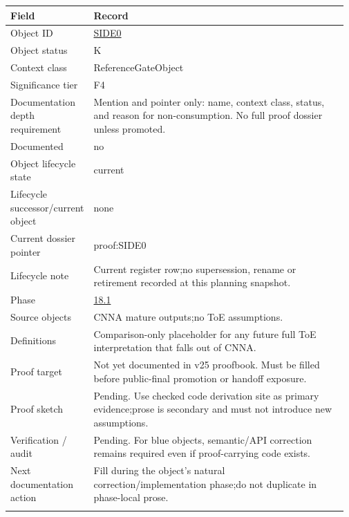 \begin{longtable}{L{0.16\linewidth} L{0.81\linewidth}}
\hline
\textbf{Field} & \textbf{Record}\\
\hline
Object ID & \hyperlink{object-row-SIDE0}{SIDE0}\\
\hline\addlinespace[0.20em]
Object status & K\\
\hline\addlinespace[0.20em]
Context class & ReferenceGateObject\\
\hline\addlinespace[0.20em]
Significance tier & F4\\
\hline\addlinespace[0.20em]
Documentation depth requirement & Mention and pointer only: name, context class, status, and reason for non-consumption. No full proof dossier unless promoted.\\
\hline\addlinespace[0.20em]
Documented & no\\
\hline\addlinespace[0.20em]
Object lifecycle state & current\\
\hline\addlinespace[0.20em]
Lifecycle successor/\allowbreak{}current object & none\\
\hline\addlinespace[0.20em]
Current dossier pointer & proof:SIDE0\\
\hline\addlinespace[0.20em]
Lifecycle note & Current register row;\newline no supersession, rename or retirement recorded at this planning snapshot.\\
\hline\addlinespace[0.20em]
Phase & \hyperlink{phase-row-18-1}{18.1}\\
\hline\addlinespace[0.20em]
Source objects & CNNA mature outputs;\newline no ToE assumptions.\\
\hline\addlinespace[0.20em]
Definitions & Comparison-only placeholder for any future full ToE interpretation that falls out of CNNA.\\
\hline\addlinespace[0.20em]
Proof target & Not yet documented in v25 proofbook. Must be filled before public-final promotion or handoff exposure.\\
\hline\addlinespace[0.20em]
Proof sketch & Pending. Use checked code derivation site as primary evidence;\newline prose is secondary and must not introduce new assumptions.\\
\hline\addlinespace[0.20em]
Verification /\allowbreak{} audit & Pending. For blue objects, semantic/\allowbreak{}API correction remains required even if proof-carrying code exists.\\
\hline\addlinespace[0.20em]
Next documentation action & Fill during the object's natural correction/\allowbreak{}implementation phase;\newline do not duplicate in phase-local prose.\\
\hline\addlinespace[0.20em]
\end{longtable}
